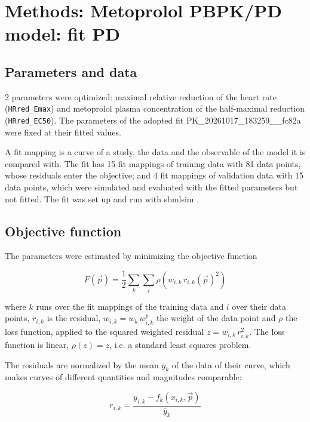 \section{Methods: Metoprolol PBPK/PD model: fit PD}

\subsection{Parameters and data}

2 parameters were optimized: maximal relative reduction of the heart rate (\texttt{HRred\_Emax}) and metoprolol plasma concentration of the half-maximal reduction (\texttt{HRred\_EC50}). The parameters of the adopted fit PK\_20261017\_183259\_\_fc82a were fixed at their fitted values.

A fit mapping is a curve of a study, the data and the observable of the model it is compared with. The fit has 15 fit mappings of training data with 81 data points, whose residuals enter the objective; and 4 fit mappings of validation data with 15 data points, which were simulated and evaluated with the fitted parameters but not fitted. The fit was set up and run with sbmlsim \cite{Koenig2026_sbmlsim}.

\subsection{Objective function}

The parameters were estimated by minimizing the objective function

\begin{equation}
F(\vec{p}) = \frac{1}{2} \sum_{k} \sum_{i} \rho\left(w_{i,k}\, r_{i,k}(\vec{p})^2\right)
\end{equation}

where $k$ runs over the fit mappings of the training data and $i$ over their data points, $r_{i,k}$ is the residual, $w_{i,k} = w_k\, w^{p}_{i,k}$ the weight of the data point and $\rho$ the loss function, applied to the squared weighted residual $z = w_{i,k}\, r_{i,k}^2$. The loss function is linear, $\rho(z) = z$, i.e. a standard least squares problem.

The residuals are normalized by the mean $\overline{y}_k$ of the data of their curve, which makes curves of different quantities and magnitudes comparable:

\begin{equation}
r_{i,k} = \frac{y_{i,k} - f_k(x_{i,k}, \vec{p})}{\overline{y}_k}
\end{equation}

